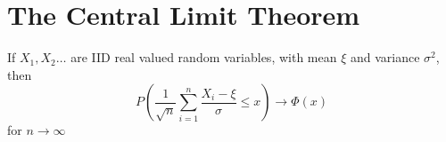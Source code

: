 \section[Lecture 13]{The Central Limit Theorem} %
\label{sec:the_central_limit_theorem}
\begin{them}
If \(X_1,X_2\ldots\) are IID real valued random variables, with mean \(\xi\) and variance \(\sigma^2\), then
\[
	P\left(\frac{1}{\sqrt{n}}\sum_{i=1}^n \frac{X_i-\xi}{\sigma}\leq x\right) \longrightarrow \Phi(x)
\]
for \(n \rightarrow \infty\)
\end{them}
